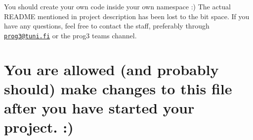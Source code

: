 You should create your own code inside your own namespace \-:) The actual R\-E\-A\-D\-M\-E mentioned in project description has been lost to the bit space. If you have any questions, feel free to contact the staff, preferably through \href{mailto:prog3@tuni.fi}{\tt prog3@tuni.\-fi} or the prog3 teams channel.

\section*{You are allowed (and probably should) make changes to this file after you have started your project. \-:)}